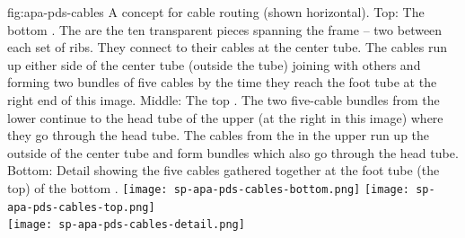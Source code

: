\begin{dunefigure}{fig:apa-pds-cables}
{A concept for  cable routing (shown horizontal). Top: The bottom .  The  are the ten transparent pieces spanning the frame -- two between each set of ribs.  They connect to their cables at the center tube.  The cables run up either side of the center tube (outside the tube) joining with others and forming two bundles of five cables by the time they reach the foot tube at the right end of this image. Middle: The top . The two five-cable bundles from the lower  continue to the head tube of the upper  (at the right in this image) where they go through the head tube.  The cables from the  in the upper  run up the outside of the center tube and form bundles which also go through the head tube. Bottom: Detail showing the five  cables gathered together at the foot tube (the top) of the bottom .}
\texttt{[image: sp-apa-pds-cables-bottom.png]}
\hspace*{4mm}\texttt{[image: sp-apa-pds-cables-top.png]}
\vspace{5mm} \\
\hspace*{-10mm}\texttt{[image: sp-apa-pds-cables-detail.png]}
\end{dunefigure}





